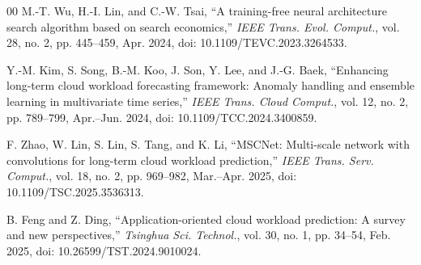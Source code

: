\documentclass[a4paper,fleqn]{cas-sc}
\begin{document}
\begin{thebibliography}{00}
 M.-T. Wu, H.-I. Lin, and C.-W. Tsai, ``A training-free neural architecture search algorithm based on search economics,'' \emph{IEEE Trans. Evol. Comput.}, vol. 28, no. 2, pp. 445--459, Apr. 2024, doi: 10.1109/TEVC.2023.3264533.

 Y.-M. Kim, S. Song, B.-M. Koo, J. Son, Y. Lee, and J.-G. Baek, ``Enhancing long-term cloud workload forecasting framework: Anomaly handling and ensemble learning in multivariate time series,'' \emph{IEEE Trans. Cloud Comput.}, vol. 12, no. 2, pp. 789--799, Apr.--Jun. 2024, doi: 10.1109/TCC.2024.3400859.

 F. Zhao, W. Lin, S. Lin, S. Tang, and K. Li, ``MSCNet: Multi-scale network with convolutions for long-term cloud workload prediction,'' \emph{IEEE Trans. Serv. Comput.}, vol. 18, no. 2, pp. 969--982, Mar.--Apr. 2025, doi: 10.1109/TSC.2025.3536313.

 B. Feng and Z. Ding, ``Application-oriented cloud workload prediction: A survey and new perspectives,'' \emph{Tsinghua Sci. Technol.}, vol. 30, no. 1, pp. 34--54, Feb. 2025, doi: 10.26599/TST.2024.9010024.

\end{thebibliography}
\end{document}
